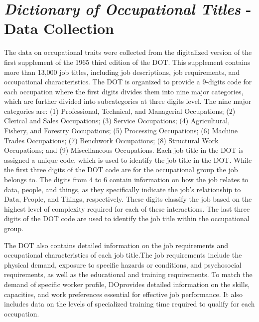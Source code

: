 \documentclass[11pt, a4paper, leqno]{article}
\begin{document}
\section{\textit{Dictionary of Occupational Titles} - Data Collection}
The data on occupational traits were collected from the digitalized version of the first supplement of the 1965 third edition of the DOT. This supplement contains more than 13,000 job titles, including job descriptions, job requirements, and occupational characteristics. The DOT is organized to provide a 9-digits code for each occupation where the first digits divides them into nine major categories, which are further divided into subcategories at three digits level. The nine major categories are: (1) Professional, Technical, and Managerial Occupations; (2) Clerical and Sales Occupations; (3) Service Occupations; (4) Agricultural, Fishery, and Forestry Occupations; (5) Processing Occupations; (6) Machine Trades Occupations; (7) Benchwork Occupations; (8) Structural Work Occupations; and (9) Miscellaneous Occupations. Each job title in the DOT is assigned a unique code, which is used to identify the job title in the DOT. While the first three digits of the DOT code are for the  occupational group the job belongs to. The digits from 4 to 6 contain information on how the job relates to data, people, and things, as they specifically indicate the job’s relationship to Data, People, and Things, respectively. These digits classify the job based on the highest level of complexity required for each of these interactions. The last three digits of the DOT code are used to identify the job title within the occupational group.

The DOT also contains detailed information on the job requirements and occupational characteristics of each job title.The job requirements include the physical demand, exposure to specific hazards or conditions, and psychosocial requirements, as well as the educational and training requirements. To match the demand of specific worker profile, DOprovides detailed information on the skills, capacities, and work preferences essential for effective job performance. It also includes data on the levels of specialized training time required to qualify for each occupation.













\newpage
\nocite{*}
\printbibliography
\end{document}
